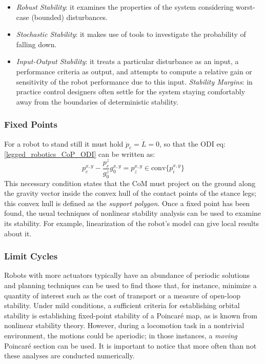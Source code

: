 \begin{itemize}
    \item \textit{Robust Stability}: it examines the properties of the system considering worst-case (bounded) disturbances.
    \item \textit{Stochastic Stability}: it makes use of tools to investigate the probability of falling down.
    \item \textit{Input-Output Stability}: it treats a particular disturbance as an input, a performance criteria as output, and attempts to compute a relative gain or sensitivity of the robot performance due to this input.
    \textit{Stability Margins}: in practice control designers often settle for the system staying comfortably away from the boundaries of deterministic stability.
\end{itemize}
\subsubsection{Fixed Points}
For a robot to stand still it must hold $\ddot{p}_c=\dot{L}=0$, so that the ODI eq:\ref{legged_robotics_CoP_ODI} can be written as:
\begin{equation*}
    p_c^{x,y}-\frac{p_c^z}{g_0^z}g_0^{x,y}=p_{z}^{x,y}\in \text{conv}\{p_i^{x,y}\}
\end{equation*}
This necessary condition states that the CoM must project on the ground along the gravity vector inside the convex hull of the contact points of the stance legs; this convex hull is defined as the \textit{support polygon}. Once a fixed point has been found, the usual techniques of nonlinear stability analysis can be used to examine its stability. For example, linearization of the robot's model can give local results about it.
\subsubsection{Limit Cycles}
Robots with more actuators typically have an abundance of periodic solutions and planning techniques can be used to find those that, for instance, minimize a quantity of interest such as the cost of transport or a measure of open-loop stability. Under mild conditions, a sufficient criteria for establishing orbital stability is establishing fixed-point stability of a Poincaré map, as is known from nonlinear stability theory. However, during a locomotion task in a nontrivial environment, the motions could be aperiodic; in those instances, a \textit{moving} Poincaré section can be used. It is important to notice that more often than not these analyses are conducted numerically.
